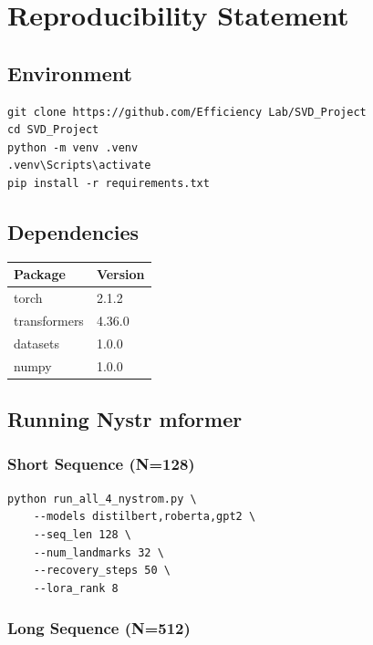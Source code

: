 
\section{Reproducibility Statement}

\subsection{Environment}

\begin{lstlisting}
git clone https://github.com/Efficiency Lab/SVD_Project
cd SVD_Project
python -m venv .venv
.venv\Scripts\activate
pip install -r requirements.txt
\end{lstlisting}

\subsection{Dependencies}

\begin{table}[H]
\centering
\small
\begin{tabular}{ll}
\toprule
\textbf{Package} & \textbf{Version} \\
\midrule
torch & 2.1.2 \\
transformers & 4.36.0 \\
datasets & 1.0.0 \\
numpy & 1.0.0 \\
\bottomrule
\end{tabular}
\end{table}

\subsection{Running Nystr mformer}

\subsubsection{Short Sequence (N=128)}

\begin{lstlisting}
python run_all_4_nystrom.py \
    --models distilbert,roberta,gpt2 \
    --seq_len 128 \
    --num_landmarks 32 \
    --recovery_steps 50 \
    --lora_rank 8
\end{lstlisting}

\subsubsection{Long Sequence (N=512)}

